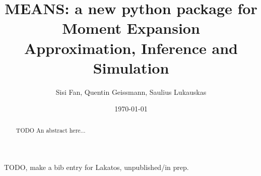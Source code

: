 \documentclass[11pt,a4paper]{article}
\begin{document}
\title{MEANS: a new python package for Moment Expansion Approximation, Inference and Simulation}
\author{Sisi Fan, Quentin Geissmann, Saulius Lukauskas}
\date{\today}



\clearpage\maketitle
\thispagestyle{empty}
\newpage{}

\begin{abstract}
TODO An abstract here...
\end{abstract}

TODO, make a bib entry for Lakatos, unpublished/in prep.


\tableofcontents
\newpage{}

\printglossaries

\newpage{}

\newpage{}

\newpage{}

\newpage{}

\newpage{}

\newpage{}
{}


\newpage{}
\begin{appendices}

\end{appendices}
   
\end{document}
